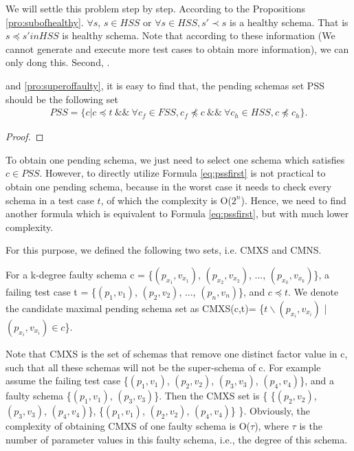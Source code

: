 
We will settle this problem step by step. According to the Propositions \ref{pro:subofhealthy}. $\forall s $, $s \in HSS$ or $\forall s \in HSS, s' \prec s$ is a healthy schema. That is $s \preceq s' in HSS$ is healthy schema. Note that according to these information (We cannot generate and execute more test cases to obtain more information), we can only dong this. Second, .

 and \ref{pro:superoffaulty}, it is easy to find that, the pending schemas set PSS should be the following set
\begin{equation}
\begin{aligned}\label{eq:pssfirst}
PSS=\{ c | c \preceq t\ \&\&\ \forall c_{f} \in FSS,  c_{f} \npreceq c  \ \&\&\  \forall c_{h} \in HSS, c \npreceq c_{h} \} .
\end{aligned}
\end{equation}

\begin{proof}
\end{proof}

To obtain one pending schema, we just need to select one schema which satisfies $ c \in PSS$. However, to directly utilize Formula \ref{eq:pssfirst} is not practical to obtain one pending schema, because in the worst case it needs to check every schema in a test case $t$, of which the complexity is O($2^{n}$). Hence, we need to find another formula which is equivalent to Formula \ref{eq:pssfirst}, but with much lower complexity.

For this purpose, we defined the following two sets, i.e. CMXS and CMNS.

\begin{definition}
For a k-degree faulty schema c = \{$(p_{x_{1}}, v_{x_{1}})$, $(p_{x_{2}}, v_{x_{2}})$, ..., $(p_{x_{k}}, v_{x_{k}})$\}, a failing test case t = \{$(p_{1}, v_{1})$, $(p_{2}, v_{2})$, ..., $(p_{n}, v_{n})$\}, and $c \preceq t$. We denote the candidate maximal pending schema set as CMXS(c,t)= \{$t \backslash (p_{x_{i}}, v_{x_{i}})$ | $(p_{x_{i}}, v_{x_{i}}) \in c $\}.
\end{definition}

Note that CMXS is the set of schemas that remove one distinct factor value in c, such that all these schemas will not be the super-schema of c. For example assume the failing test case \{$(p_{1}, v_{1})$, $(p_{2}, v_{2})$, $(p_{3}, v_{3})$, $(p_{4}, v_{4})$\}, and a faulty schema \{$(p_{1}, v_{1})$, $(p_{3}, v_{3})$\}. Then the CMXS set is \{ \{$(p_{2}, v_{2})$,  $(p_{3}, v_{3})$, $(p_{4}, v_{4})$\}, \{$(p_{1}, v_{1})$,  $(p_{2}, v_{2})$, $(p_{4}, v_{4})$\} \}. Obviously, the complexity of obtaining CMXS of one faulty schema is O($\tau$), where $\tau$ is the number of parameter values in this faulty schema, i.e., the degree of this schema.

